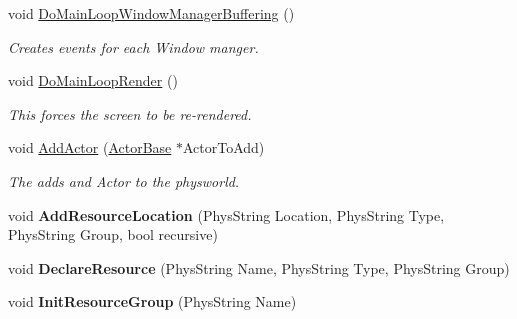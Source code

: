 \begin{DoxyCompactItemize}
void \hyperlink{classPhysWorld_ae81bab7f314d98f7b787c508e60c9c9a}{DoMainLoopWindowManagerBuffering} ()
\begin{DoxyCompactList}\small\item\em Creates events for each Window manger. \item\end{DoxyCompactList}\item 
void \hyperlink{classPhysWorld_a8f33541d67164a2452e568443e9905be}{DoMainLoopRender} ()
\begin{DoxyCompactList}\small\item\em This forces the screen to be re-\/rendered. \item\end{DoxyCompactList}\item 
void \hyperlink{classPhysWorld_ae490054b3e1c4c5aa69cb8e3b7bd2f29}{AddActor} (\hyperlink{classActorBase}{ActorBase} $\ast$ActorToAdd)
\begin{DoxyCompactList}\small\item\em The adds and Actor to the physworld. \item\end{DoxyCompactList}\item 
\hypertarget{classPhysWorld_a757783fa596bda8ebdbc24234c6b621a}{
void {\bfseries AddResourceLocation} (PhysString Location, PhysString Type, PhysString Group, bool recursive)}
\label{db/df5/classPhysWorld_a757783fa596bda8ebdbc24234c6b621a}

\item 
\hypertarget{classPhysWorld_a908c21f7f5452f8d7c6d4b5b2308ba5e}{
void {\bfseries DeclareResource} (PhysString Name, PhysString Type, PhysString Group)}
\label{db/df5/classPhysWorld_a908c21f7f5452f8d7c6d4b5b2308ba5e}

\item 
\hypertarget{classPhysWorld_a0b67df4c76c32b9b2bdcafdc51f6aba7}{
void {\bfseries InitResourceGroup} (PhysString Name)}
\label{db/df5/classPhysWorld_a0b67df4c76c32b9b2bdcafdc51f6aba7}

\end{DoxyCompactItemize}
